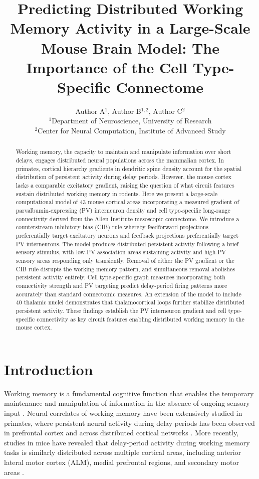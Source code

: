 \documentclass[11pt]{article}
\title{Predicting Distributed Working Memory Activity in a Large-Scale Mouse Brain Model: The Importance of the Cell Type-Specific Connectome}
\author{Author A$^{1}$, Author B$^{1,2}$, Author C$^{2}$ \\
\small $^{1}$Department of Neuroscience, University of Research \\
\small $^{2}$Center for Neural Computation, Institute of Advanced Study}
\date{}
\begin{document}
\maketitle

\begin{abstract}
Working memory, the capacity to maintain and manipulate information over short delays, engages distributed neural populations across the mammalian cortex. In primates, cortical hierarchy gradients in dendritic spine density account for the spatial distribution of persistent activity during delay periods. However, the mouse cortex lacks a comparable excitatory gradient, raising the question of what circuit features sustain distributed working memory in rodents. Here we present a large-scale computational model of 43 mouse cortical areas incorporating a measured gradient of parvalbumin-expressing (PV) interneuron density and cell type-specific long-range connectivity derived from the Allen Institute mesoscopic connectome. We introduce a counterstream inhibitory bias (CIB) rule whereby feedforward projections preferentially target excitatory neurons and feedback projections preferentially target PV interneurons. The model produces distributed persistent activity following a brief sensory stimulus, with low-PV association areas sustaining activity and high-PV sensory areas responding only transiently. Removal of either the PV gradient or the CIB rule disrupts the working memory pattern, and simultaneous removal abolishes persistent activity entirely. Cell type-specific graph measures incorporating both connectivity strength and PV targeting predict delay-period firing patterns more accurately than standard connectomic measures. An extension of the model to include 40 thalamic nuclei demonstrates that thalamocortical loops further stabilize distributed persistent activity. These findings establish the PV interneuron gradient and cell type-specific connectivity as key circuit features enabling distributed working memory in the mouse cortex.
\end{abstract}

\section{Introduction}

Working memory is a fundamental cognitive function that enables the temporary maintenance and manipulation of information in the absence of ongoing sensory input \citep{baddeley2003}. Neural correlates of working memory have been extensively studied in primates, where persistent neural activity during delay periods has been observed in prefrontal cortex and across distributed cortical networks \citep{funahashi1989,goldman-rakic1995}. More recently, studies in mice have revealed that delay-period activity during working memory tasks is similarly distributed across multiple cortical areas, including anterior lateral motor cortex (ALM), medial prefrontal regions, and secondary motor areas \citep{guo2014,li2016}.
\end{document}
